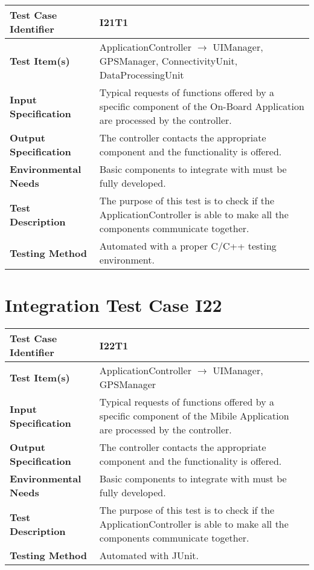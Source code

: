 \begin{longtable}{p{} | p{}}
\hline
\textbf{Test Case Identifier} & I21T1\\
\hline
\textbf{Test Item(s)} & ApplicationController  $\rightarrow$ UIManager, GPSManager, ConnectivityUnit, DataProcessingUnit  \\
\hline
\textbf{Input Specification} & Typical requests of functions offered by a specific component of the On-Board Application are processed by the controller. \\
\hline
\textbf{Output Specification} & The controller contacts the appropriate component and the functionality is offered. \\
\hline
\textbf{Environmental Needs} & Basic components to integrate with must be fully developed. \\
\hline
\textbf{Test Description} & The purpose of this test is to check if the ApplicationController is able to make all the components communicate together. \\
\hline
\textbf{Testing Method} & Automated with a proper C/C++ testing environment. \\
\hline
\end{longtable}

\section{Integration Test Case I22}

\begin{longtable}{p{} | p{}}
\hline
\textbf{Test Case Identifier} & I22T1\\
\hline
\textbf{Test Item(s)} & ApplicationController  $\rightarrow$ UIManager, GPSManager \\
\hline
\textbf{Input Specification} & Typical requests of functions offered by a specific component of the Mibile Application are processed by the controller. \\
\hline
\textbf{Output Specification} & The controller contacts the appropriate component and the functionality is offered. \\
\hline
\textbf{Environmental Needs} & Basic components to integrate with must be fully developed. \\
\hline
\textbf{Test Description} & The purpose of this test is to check if the ApplicationController is able to make all the components communicate together. \\
\hline
\textbf{Testing Method} & Automated with JUnit. \\
\hline
\end{longtable}

